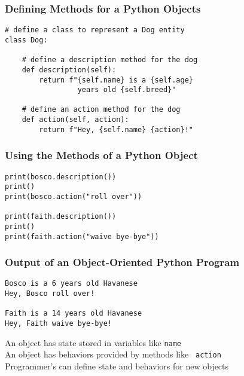 \documentclass[14pt,aspectratio=169]{beamer}
\begin{document}
%
\begin{frame}[fragile]
  \frametitle{Defining Methods for a Python Objects}
  \hspace*{-.15in}
  \begin{minipage}{6in}
    \vspace*{.2in}
    \begin{verbatim}
# define a class to represent a Dog entity
class Dog:

    # define a description method for the dog
    def description(self):
        return f"{self.name} is a {self.age}
                 years old {self.breed}"

    # define an action method for the dog
    def action(self, action):
        return f"Hey, {self.name} {action}!"
    \end{verbatim}
  \end{minipage}
\end{frame}

%
\begin{frame}[fragile]
  \frametitle{Using the Methods of a Python Object}
  \hspace*{-.05in}
  \begin{minipage}{6in}
    \vspace*{.1in}
    \begin{verbatim}
print(bosco.description())
print()
print(bosco.action("roll over"))

print(faith.description())
print()
print(faith.action("waive bye-bye"))
    \end{verbatim}
  \end{minipage}
\end{frame}

%
\begin{frame}[fragile]
  \frametitle{Output of an Object-Oriented Python Program}
  \hspace*{-.05in}
  \begin{minipage}{6in}
    \vspace*{.2in}
    \begin{verbatim}
Bosco is a 6 years old Havanese
Hey, Bosco roll over!

Faith is a 14 years old Havanese
Hey, Faith waive bye-bye!
    \end{verbatim}
  \end{minipage}
  \vspace*{.05in}
  \begin{center}
    \normalsize \noindent An object has state stored in variables like {\tt name} \\
    \normalsize \noindent An object has behaviors provided by methods like {\tt
    action} \\
    \normalsize \noindent Programmer's can define state and behaviors for new
    objects \\
  \end{center}
\end{frame}
\end{document}
